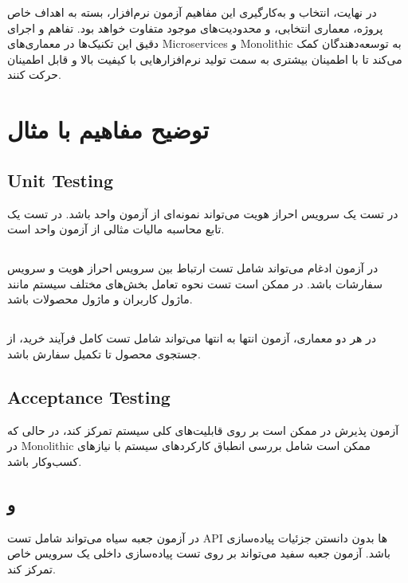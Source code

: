 در نهایت، انتخاب و به‌کارگیری این مفاهیم آزمون نرم‌افزار، بسته به اهداف خاص پروژه، معماری انتخابی، و محدودیت‌های موجود متفاوت خواهد بود. تفاهم و اجرای دقیق این تکنیک‌ها در معماری‌های Microservices و Monolithic به توسعه‌دهندگان کمک می‌کند تا با اطمینان بیشتری به سمت تولید نرم‌افزارهایی با کیفیت بالا و قابل اطمینان حرکت کنند.

\section*{توضیح مفاهیم با مثال}

\subsection*{Unit Testing}
در
تست یک سرویس احراز هویت می‌تواند نمونه‌ای از آزمون واحد باشد. در 
تست یک تابع محاسبه مالیات مثالی از آزمون واحد است.

\subsection*{}
در 
آزمون ادغام می‌تواند شامل تست ارتباط بین سرویس احراز هویت و سرویس سفارشات باشد. در 
ممکن است تست نحوه تعامل بخش‌های مختلف سیستم مانند ماژول کاربران و ماژول محصولات باشد.

\subsection*{}
در هر دو معماری، آزمون انتها به انتها می‌تواند شامل تست کامل فرآیند خرید، از جستجوی محصول تا تکمیل سفارش باشد.

\subsection*{Acceptance Testing}
آزمون پذیرش در
 ممکن است بر روی قابلیت‌های کلی سیستم تمرکز کند، در حالی که در Monolithic ممکن است شامل بررسی انطباق کارکردهای سیستم با نیازهای کسب‌وکار باشد.

\subsection*{ و }
در
 آزمون جعبه سیاه می‌تواند شامل تست API ها بدون دانستن جزئیات پیاده‌سازی باشد. آزمون جعبه سفید می‌تواند بر روی تست پیاده‌سازی داخلی یک سرویس خاص تمرکز کند.

